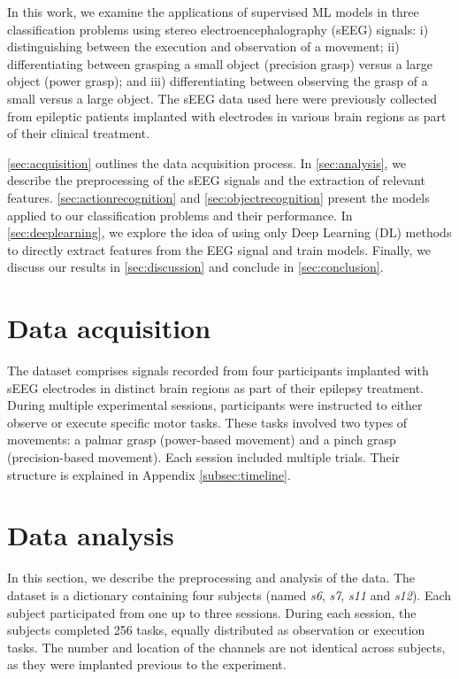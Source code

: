 \documentclass[10pt,conference,compsocconf]{IEEEtran}
\begin{document}
In this work, we examine the applications of supervised ML models in three classification problems using stereo electroencephalography (sEEG) signals: i) distinguishing between the execution and observation of a movement; ii) differentiating between grasping a small object (precision grasp) versus a large object (power grasp); and iii) differentiating between observing the grasp of a small versus a large object. The sEEG data used here were previously collected from epileptic patients implanted with electrodes in various brain regions as part of their clinical treatment.

\autoref{sec:acquisition} outlines the data acquisition process. In \autoref{sec:analysis}, we describe the preprocessing of the sEEG signals and the extraction of relevant features. \autoref{sec:actionrecognition} and \autoref{sec:objectrecognition} present the models applied to our classification problems and their performance. In \autoref{sec:deeplearning}, we explore the idea of using only Deep Learning (DL) methods to directly extract features from the EEG signal and train models. Finally, we discuss our results in \autoref{sec:discussion} and conclude in \autoref{sec:conclusion}.

\section{Data acquisition}
\label{sec:acquisition}
The dataset comprises signals recorded from four participants implanted with sEEG electrodes in distinct brain regions as part of their epilepsy treatment. During multiple experimental sessions, participants were instructed to either observe or execute specific motor tasks. These tasks involved two types of movements: a palmar grasp (power-based movement) and a pinch grasp (precision-based movement). Each session included multiple trials. Their structure is explained in Appendix \ref{subsec:timeline}.

\section{Data analysis}
\label{sec:analysis}
In this section, we describe the preprocessing and analysis of the data. The dataset is a dictionary containing four subjects (named \textit{s6}, \textit{s7}, \textit{s11} and \textit{s12}). Each subject participated from one up to three sessions. During each session, the subjects completed 256 tasks, equally distributed as observation or execution tasks. The number and location of the channels are not identical across subjects, as they were implanted previous to the experiment.
\end{document}
